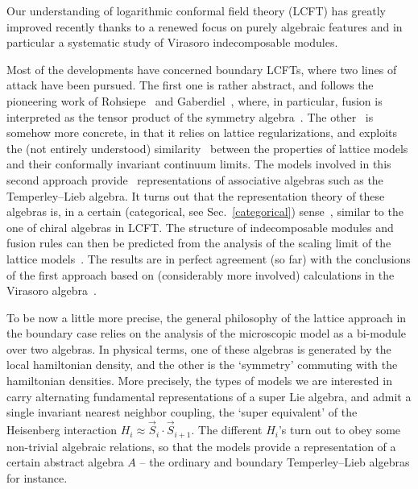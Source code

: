 \documentclass[11pt]{article}
\theoremstyle{definition}
\begin{document}
Our understanding of logarithmic conformal field theory (LCFT) has
greatly improved recently thanks to a renewed focus on purely algebraic features and  in particular a systematic study of Virasoro
indecomposable modules.

Most of the developments have concerned   boundary LCFTs, where two lines of attack have been pursued. The
first one is rather abstract, and follows the pioneering work of
Rohsiepe~\cite{Rohsiepe} and Gaberdiel~\cite{Gab1}, where, in
particular, fusion is interpreted as the tensor product of the
symmetry algebra~\cite{GK1,MatRid,EbFl}. The other~\cite{Pearceetal,
ReadSaleur07-2} is somehow more concrete, in that it relies on lattice
regularizations, and exploits the (not entirely understood) similarity~\cite{PasquierSaleur} between the properties of lattice models and their conformally invariant continuum limits.
  The models involved in this second approach provide~\cite{Martinbook} representations of
associative algebras such as the Temperley--Lieb algebra. It turns out
that the representation theory of these algebras is, in a certain (categorical, see Sec.~\ref{categorical})
sense~\cite{ReadSaleur07-1}, similar to the one of chiral algebras in
LCFT. The structure of indecomposable modules and fusion rules can
then be predicted from the analysis of the scaling limit of the lattice
models~\cite{Pearceetal, ReadSaleur07-2,RP}. The results are in perfect agreement
(so far) with the conclusions of the first approach based on (considerably more involved) calculations in the Virasoro algebra~\cite{MatRid,KitRid}.

To be now a little more precise, the general philosophy of the lattice approach in the boundary case relies on the  analysis of  the microscopic  model as a bi-module
over two algebras. In physical terms, one of these algebras is
generated by the local hamiltonian density, and the other is the
`symmetry' commuting with the hamiltonian densities. More precisely,
the types of models we are interested in carry alternating fundamental
representations of a super Lie algebra, and admit a single invariant
nearest neighbor coupling, the `super equivalent' of the Heisenberg
interaction $H_i\approx \vec{S}_i\cdot\vec{S}_{i+1}$. The different
$H_i$'s turn out to obey some non-trivial algebraic relations, so that
the models provide a representation of a certain abstract algebra $A$
-- the ordinary and boundary Temperley--Lieb algebras for instance.
\end{document}
